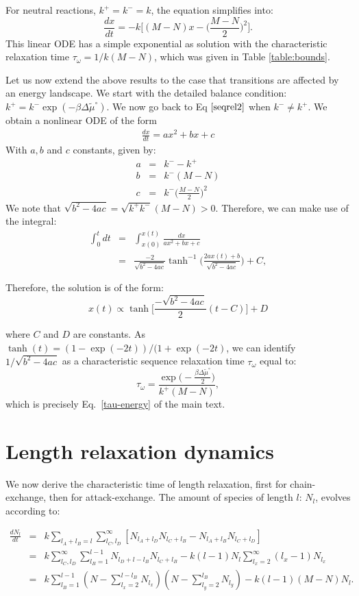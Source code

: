 \documentclass[
	amsmath,
	amssymb,
	a4paper,
	aip,		%
	jcp,		%
	reprint, twocolumn  %
	fleqn,
	showpacs,
	floatfix
]{revtex4-1}
\newcommand{\be}{\begin{equation}}
\newcommand{\ee}{\end{equation}}
\newcommand{\bea}{\begin{eqnarray}}
\newcommand{\eea}{\end{eqnarray}}
\begin{document}
For neutral reactions, $k^{+}=k^{-}=k$, the equation simplifies into: 
\be
\frac{dx}{dt} =-k \Big[ (M-N) x - \Big(\frac{M-N}{2} \Big)^{2} \Big].
\label{seqrel3}
\ee 
This linear ODE has a simple exponential as solution
with the characteristic relaxation time 
$\tau_{\omega}=1/k (M-N)$, which was given in Table \ref{table:bounds}.




Let us now extend the above results to the case that transitions are affected by an energy landscape.
We start with the detailed balance condition: $k^{+}=k^{-} \exp{(-\beta \Delta \tilde{\mu}^{\circ}) }$. 
We now go back to Eq $\eqref{seqrel2}$ when $k^{-} \neq k^{+}$. We obtain a nonlinear ODE of the form
\bea
\frac{d x }{dt} =  a x^{2} + b x + c \label{seqrel4}
\eea
With $a,b$ and $c$ constants, given by:
\bea
a&=&k^{-}-k^{+} \label{constants} \nonumber \\ 
b&=&k^{-} (M-N)  \nonumber \\
c&=&k^{-}\Big(\frac{M-N}{2}\Big)^{2} 
\eea
We note that $\sqrt{b^{2}-4ac}=\sqrt{k^+ k^-} (M-N)>0$.
Therefore, we can make use of the integral:
\bea
\int_{0}^{t} dt &=&\int_{x(0)}^{x(t)} \frac{dx}{ax^{2}+bx+c} \label{integ} \\ \nonumber
&=& \frac{-2}{\sqrt{b^{2}-4ac}} \tanh^{-1}{ \Big( \frac{2 a x(t) + b}{\sqrt{b^{2} - 4 a c}}} \Big) + C,
\eea



Therefore, the solution is of the form:
\be
x(t) \propto \tanh{\Big[ \frac{-\sqrt{b^{2}- 4ac}}{2} (t-C) \Big]}+D
\label{relhyp}
\ee

where $C$ and $D$ are constants. As $\tanh(t)=(1-\exp(-2t))/(1+\exp(-2t)$, we can identify $1/\sqrt{b^{2}- 4ac} $ as a characteristic sequence relaxation time $\tau_{\omega}$ equal to:
\be
\tau_{\omega}= \frac{ \exp\big(-\frac{\beta \Delta \tilde{\mu}^{\circ}}{2}\big)}{k^{+} (M-N) },
\ee
which is precisely Eq.~\eqref{tau-energy} of the main text.


\section{Length relaxation dynamics}
\label{app:B}
We now derive the characteristic time of length relaxation, first for chain-exchange, then for attack-exchange. 
The amount of species of length $l$: $N_{l}$, evolves according to:


\begin{widetext}
\bea
\frac{d N_{l}}{dt} &=& k \sum\limits_{l_{A}+l_{B}=l} \sum\limits_{l_{C},l_{D}}^{\infty} [N_{l_{A}+l_{D}} 
N_{l_{C}+l_{B}} -N_{l_{A}+l_{B}} N_{l_{C}+l_{D}} ] \label{LChex2} \\ \nonumber 
&=& k \sum_{l_{C},l_{D}}^{\infty} \sum_{l_{B}=1}^{l-1} N_{l_{D}+l-l_{B}} N_{l_{C}+l_{B}}  -k (l-1) N_{l} 
\sum_{l_{x}=2}^{\infty} (l_{x} -1) N_{l_{x}}  \\
\nonumber &=& k \sum_{l_{B}=1}^{l-1} \left(N-\sum_{l_{x}=2}^{l-l_{B}} N_{l_{x}} \right) \left( N-\sum_{l_{y}=2}^{l_{B}}N_{l_{y}} \right) 
-k(l-1) (M-N) N_{l}.   
\eea
\end{widetext}
\end{document}
